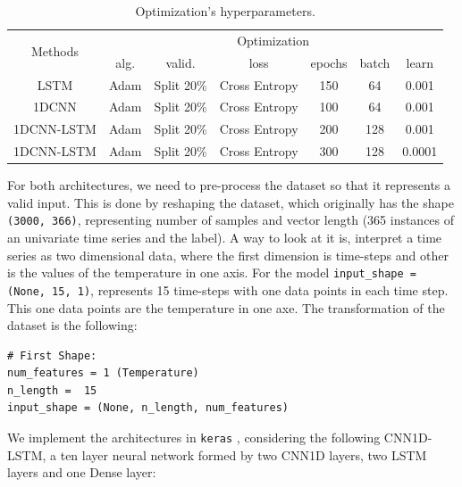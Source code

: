 \begin{table}[h]
	\centering
	\tiny
	\begin{tabular}{|c|c|c|c|c|c|c|}
		\hline
		\multirow{2}{*}{Methods} & \multicolumn{6}{c|}{Optimization} \\
		\cline{2-7}
		& alg. & valid. & loss & epochs & batch & learn \\
		\cline{2-7}
		\hline
		LSTM & Adam & Split 20\% & Cross Entropy & 150 & 64 & 0.001 \\
		\hline
		1DCNN & Adam & Split 20\% & Cross Entropy & 100 & 64 & 0.001 \\
		\hline
		1DCNN-LSTM & Adam & Split 20\% & Cross Entropy & 200 & 128 & 0.001 \\
		\hline
		1DCNN-LSTM & Adam & Split 20\% & Cross Entropy & 300 & 128 & 0.0001 \\
		\hline
	\end{tabular}
	\caption{Optimization’s hyperparameters.}
	\label{Table:OptimizationNN}
\end{table}

For both architectures, we need to pre-process the dataset so that it represents a valid input. This is done by reshaping the dataset, which originally has the shape \texttt{(3000, 366)}, representing number of samples and vector length (365 instances of an univariate time series and the label). A way to look at it is, interpret a time series as two dimensional data, where the first dimension is time-steps and other is the values of the  temperature in one axis. For the model \texttt{input\_shape = (None, 15, 1)}, represents 15 time-steps with one data points in each time step. This one data points are the temperature in one axe. The transformation of the dataset is the following:

\lstset{language=Python}
\lstset{frame=lines}
\lstset{basicstyle=\footnotesize}
\begin{lstlisting}
# First Shape:
num_features = 1 (Temperature)
n_length =  15
input_shape = (None, n_length, num_features)
\end{lstlisting}

We implement the architectures in \texttt{keras} \cite{Chollet2015},  considering the following CNN1D-LSTM, a ten layer neural network formed by two CNN1D layers, two LSTM layers and one Dense layer:

